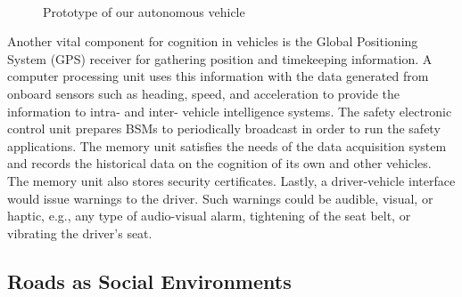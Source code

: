 \documentclass[journal, 11pt]{IEEEtran}
\begin{document}
\begin{figure}[ht]
  \quad
  ~
  ~
  \vspace*{-4mm}
  \label{fig:overall-prototype}
  \caption{Prototype of our autonomous vehicle}
  \vspace*{-6mm}
\end{figure}

Another vital component for cognition in vehicles is the Global Positioning
System (GPS) receiver for gathering position and timekeeping information. A
computer processing unit uses this information with the data generated from
onboard sensors such as heading, speed, and acceleration to provide the
information to intra- and inter- vehicle intelligence systems. The safety
electronic control unit prepares BSMs to periodically broadcast in order to run
the safety applications. The memory unit satisfies the needs of the data
acquisition system and records the historical data on the cognition of its
own and other vehicles. The memory unit also stores security certificates.
Lastly, a driver-vehicle interface would issue warnings to the driver. Such
warnings could be audible, visual, or haptic, e.g., any type of audio-visual
alarm, tightening of the seat belt, or vibrating the driver's seat.

\subsection{Roads as Social Environments}
\end{document}
